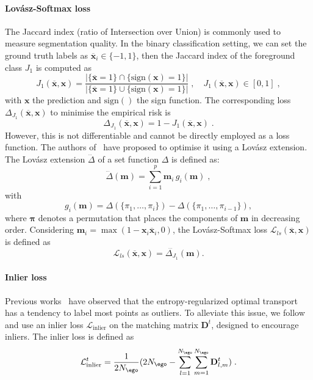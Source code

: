 \paragraph{Lov\'{a}sz-Softmax loss}
The Jaccard index (ratio of Intersection over Union) is commonly used to measure segmentation quality. In the binary classification setting, we can set the ground truth labels as $\overline{\mathbf{x}}_i \in \{-1,1\}$, then the Jaccard index of the foreground class $J_1$ is computed as
\begin{equation}
    J_1(\overline{\mathbf{x}}, \mathbf{x}) = \frac{|\{\overline{\mathbf{x}} = 1\} \cap \{\mathrm{sign}(\mathbf{x}) = 1\}|}{|\{\overline{\mathbf{x}} = 1\} \cup \{\mathrm{sign}(\mathbf{x}) = 1\}|}\;, \quad J_1(\overline{\mathbf{x}}, \mathbf{x}) \in [0,1]\;,
\end{equation}
with $\mathbf{x}$ the prediction and $\mathrm{sign}()$ the sign function. The corresponding loss $\Delta_{J_1}(\overline{\mathbf{x}}, \mathbf{x})$ to minimise the empirical risk is
\begin{equation}
    \Delta_{J_1}(\overline{\mathbf{x}}, \mathbf{x}) = 1 - J_1(\overline{\mathbf{x}}, \mathbf{x})\;.
\end{equation}
However, this is not differentiable and cannot be directly employed as a loss function. The authors of~\cite{berman2018lovasz} have proposed to optimise it using a Lov\'{a}sz extension. The Lov\'{a}sz extension $\dddot{\Delta}$ of a set function $\Delta$ is defined as:
\begin{equation}
    \dddot{\Delta} (\mathbf{m}) = \sum_{i=1}^{p} \mathbf{m}_i \, g_i(\mathbf{m})\;,
\end{equation}
with 
\begin{equation}
g_i(\mathbf{m}) =
\Delta(\{\pi_1, \ldots, \pi_i\})- \Delta(\{\pi_1, \ldots, \pi_{i-1}\}),
\end{equation}
where $\mathbf{\pi}$ denotes a permutation that places the components of $\mathbf{m}$ in decreasing order. Considering $\mathbf{m}_i = \max(1 - \mathbf{x}_i \overline{\mathbf{x}}_i, 0)$, the Lov\'{a}sz-Softmax loss $\mathcal{L}_{ls}(\overline{\mathbf{x}}, \mathbf{x})$ is defined as 
\begin{equation}
    \mathcal{L}_{ls}(\overline{\mathbf{x}}, \mathbf{x}) = \dddot{\Delta_{J_1}}(\mathbf{m}).
\end{equation}


\paragraph{Inlier loss}
Previous works~\cite{yew2020rpm,gojcic2021weakly} have observed that the entropy-regularized optimal transport~\cite{cuturi2013sinkhorn} has a tendency to label most points as outliers. To alleviate this issue, we follow~\cite{yew2020rpm,gojcic2021weakly} and use an inlier loss $\mathcal{L}_{\text{inlier}}$ on the matching matrix $\mathbf{D}^t$, designed to encourage inliers. The inlier loss is defined as
\begin{equation}
    \mathcal{L}_{\text{inlier}}^t = \frac{1}{2N_{\ego}} (2N_{\ego} - \sum_{l=1}^{N_\ego} \sum_{m=1}^{N_\ego} \mathbf{D}_{l,m}^t)\;.
\end{equation}


